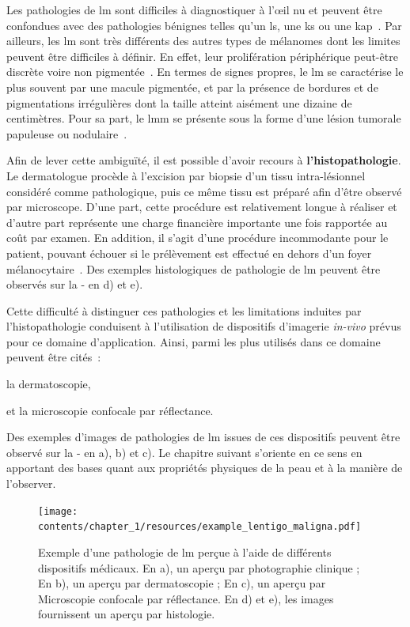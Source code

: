 Les pathologies de \gls{lm} sont difficiles à diagnostiquer à l’œil nu et peuvent être confondues avec des pathologies bénignes telles qu'un \gls{ls}, une \gls{ks} ou une \gls{kap}~\cite{LeDuff2014}. Par ailleurs, les \gls{lm} sont très différents des autres types de mélanomes dont les limites peuvent être difficiles à définir. En effet, leur prolifération périphérique peut-être discrète voire non pigmentée~\cite{LeGal2011}. En termes de signes propres, le \gls{lm} se caractérise le plus souvent par une macule pigmentée, et par la présence de bordures et de pigmentations irrégulières dont la taille atteint aisément une dizaine de centimètres. Pour sa part, le \gls{lmm} se présente sous la forme d'une lésion tumorale papuleuse ou nodulaire~\cite{Mckenna2006, LeGal2011}.\par

Afin de lever cette ambiguïté, il est possible d'avoir recours à \textbf{l'histopathologie}. Le dermatologue procède à l'excision par biopsie d'un tissu intra-lésionnel considéré comme pathologique, puis ce même tissu est préparé afin d'être observé par microscope. D'une part, cette procédure est relativement longue à réaliser et d'autre part représente une charge financière importante une fois rapportée au coût par examen. En addition, il s'agit d'une procédure incommodante pour le patient, pouvant échouer si le prélèvement est effectué en dehors d'un foyer mélanocytaire~\cite{LeGal2011}. Des exemples histologiques de pathologie de \gls{lm} peuvent être observés sur la  - en d) et e).\par

Cette difficulté à distinguer ces pathologies et les limitations induites par l'histopathologie conduisent à l'utilisation de dispositifs d'imagerie \textit{in-vivo} prévus pour ce domaine d'application. Ainsi, parmi les plus utilisés dans ce domaine peuvent être cités~:
\begin{inlinerate}
    \item la dermatoscopie,
    \item et la microscopie confocale par réflectance.
\end{inlinerate} Des exemples d'images de pathologies de \gls{lm} issues de ces dispositifs peuvent être observé sur la  - en a), b) et c). Le chapitre suivant s'oriente en ce sens en apportant des bases quant aux propriétés physiques de la peau et à la manière de l'observer.\par

\begin{figure}[H]
    \centering
    \texttt{[image: contents/chapter\_1/resources/example\_lentigo\_maligna.pdf]}
    \caption{Exemple d'une pathologie de \gls{lm} perçue à l'aide de différents dispositifs médicaux. En a), un aperçu par photographie clinique ; En b), un aperçu par dermatoscopie ; En c), un aperçu par Microscopie confocale par réflectance. En d) et e), les images fournissent un aperçu par histologie.}
    \label{fig:example_lentigo_maligna}
\end{figure}\par